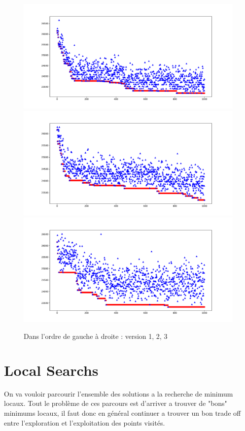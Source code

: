 \documentclass[10pt,a4paper]{article}
\begin{document}
\begin{figure}

\includegraphics[scale=.3]{images/without_error_1000_v1}
\includegraphics[scale=.4]{images/without_error_1000_v2}
\includegraphics[scale=.3
]{images/without_error_1000_v3}
\caption{Dans l'ordre de gauche à droite : version 1, 2, 3}
\end{figure}


\section{Local Searchs}

On va vouloir parcourir l'ensemble des solutions a la recherche de minimum locaux. Tout le problème de ces parcours est d'arriver a trouver de "bons" minimums locaux, il faut donc en général continuer a trouver un bon trade off entre l'exploration et l'exploitation des points visités.  
\end{document}
